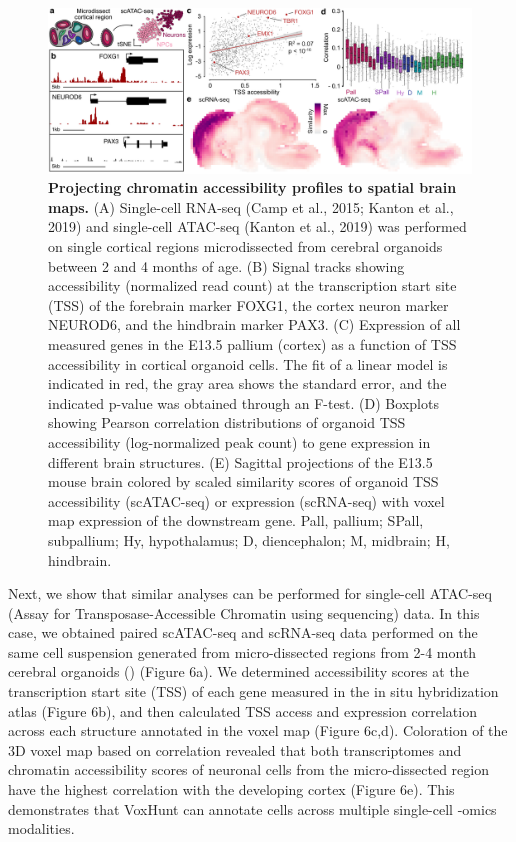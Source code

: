\begin{figure}[b!]
    \centering
	\includegraphics[width=\textwidth]{figures/voxhunt/Figure_6}
    \caption{\textbf{Projecting chromatin accessibility profiles to spatial brain maps.} (A) Single-cell RNA-seq (Camp et al., 2015; Kanton et al., 2019) and single-cell ATAC-seq (Kanton et al., 2019) was performed on single cortical regions microdissected from cerebral organoids between 2 and 4 months of age. (B) Signal tracks showing accessibility (normalized read count) at the transcription start site (TSS) of the forebrain marker FOXG1, the cortex neuron marker NEUROD6, and the hindbrain marker PAX3. (C) Expression of all measured genes in the E13.5 pallium (cortex) as a function of TSS accessibility in cortical organoid cells. The fit of a linear model is indicated in red, the gray area shows the standard error, and the indicated p-value was obtained through an F-test. (D) Boxplots showing Pearson correlation distributions of organoid TSS accessibility (log-normalized peak count) to gene expression in different brain structures. (E) Sagittal projections of the E13.5 mouse brain colored by scaled similarity scores of organoid TSS accessibility (scATAC-seq) or expression (scRNA-seq) with voxel map expression of the downstream gene. Pall, pallium; SPall, subpallium; Hy, hypothalamus; D, diencephalon; M, midbrain; H, hindbrain.}
    \label{fig:vox6}
\end{figure}



Next, we show that similar analyses can be performed for single-cell ATAC-seq (Assay for Transposase-Accessible Chromatin using sequencing) data. In this case, we obtained paired scATAC-seq and scRNA-seq data performed on the same cell suspension generated from micro-dissected regions from 2-4 month cerebral organoids (\cite{kanton_organoid_2019}) (Figure 6a). We determined accessibility scores at the transcription start site (TSS) of each gene measured in the in situ hybridization atlas (Figure 6b), and then calculated TSS access and expression correlation across each structure annotated in the voxel map (Figure 6c,d). Coloration of the 3D voxel map based on correlation revealed that both transcriptomes and chromatin accessibility scores of neuronal cells from the micro-dissected region have the highest correlation with the developing cortex (Figure 6e). This demonstrates that VoxHunt can annotate cells across multiple single-cell -omics modalities.

